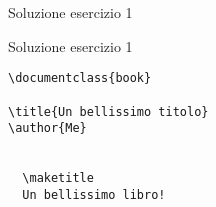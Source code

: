 \begin{frame}[fragile]{Soluzione esercizio 1}

\begin{block}{Soluzione esercizio 1}
\begin{lstlisting}
\documentclass{book}

\title{Un bellissimo titolo}
\author{Me}


  \maketitle
  Un bellissimo libro!

\end{lstlisting}
\end{block}

\end{frame}